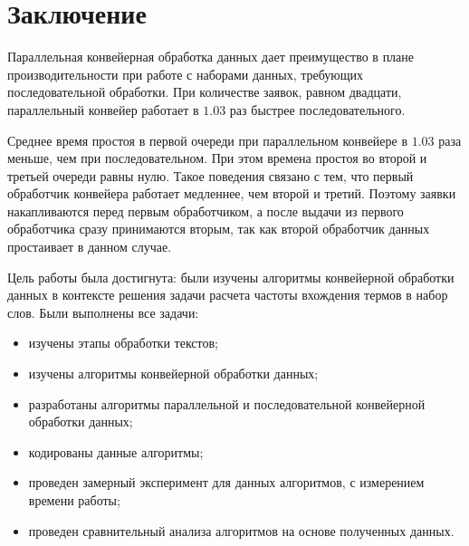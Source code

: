 \chapter*{Заключение}

Параллельная конвейерная обработка данных дает преимущество в плане производительности при работе с наборами данных, требующих последовательной обработки. При количестве заявок, равном двадцати, параллельный конвейер работает в $1.03$ раз быстрее последовательного.

Среднее время простоя в первой очереди при параллельном конвейере в $1.03$ раза меньше, чем при последовательном. При этом времена простоя во второй и третьей очереди равны нулю. Такое поведения связано с тем, что первый обработчик конвейера работает медленнее, чем второй и третий. Поэтому заявки накапливаются перед первым обработчиком, а после выдачи из первого обработчика сразу принимаются вторым, так как второй обработчик данных простаивает в данном случае.

Цель работы была достигнута: были изучены алгоритмы конвейерной обработки данных в контексте решения задачи расчета частоты вхождения термов в набор слов. Были выполнены все задачи:

\begin{itemize}
	\item изучены этапы обработки текстов;
	\item изучены алгоритмы конвейерной обработки данных;
	\item разработаны алгоритмы параллельной и последовательной конвейерной обработки данных;
	\item кодированы данные алгоритмы;
	\item проведен замерный эксперимент для данных алгоритмов, с измерением времени работы; 
	\item проведен сравнительный анализа алгоритмов на основе полученных данных.
\end{itemize}


\newpage